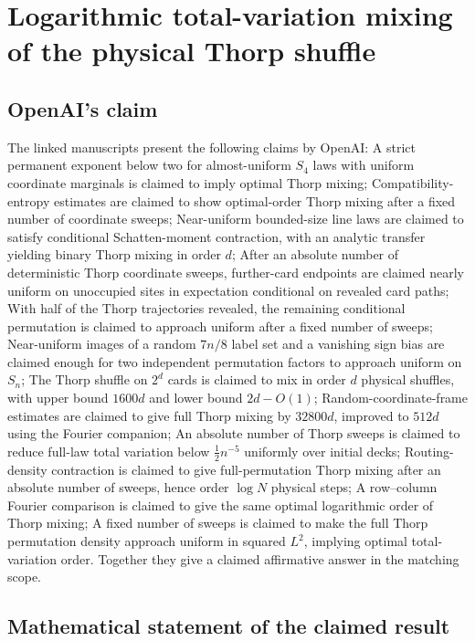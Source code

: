 \documentclass[11pt]{article}
\begin{document}
\section*{Logarithmic total-variation mixing of the physical Thorp shuffle}

\subsection{OpenAI's claim}
The linked manuscripts present the following claims by OpenAI: A strict permanent exponent below two for almost-uniform $S_4$ laws with uniform coordinate marginals is claimed to imply optimal Thorp mixing; Compatibility-entropy estimates are claimed to show optimal-order Thorp mixing after a fixed number of coordinate sweeps; Near-uniform bounded-size line laws are claimed to satisfy conditional Schatten-moment contraction, with an analytic transfer yielding binary Thorp mixing in order $d$; After an absolute number of deterministic Thorp coordinate sweeps, further-card endpoints are claimed nearly uniform on unoccupied sites in expectation conditional on revealed card paths; With half of the Thorp trajectories revealed, the remaining conditional permutation is claimed to approach uniform after a fixed number of sweeps; Near-uniform images of a random $7n/8$ label set and a vanishing sign bias are claimed enough for two independent permutation factors to approach uniform on $S_n$; The Thorp shuffle on $2^d$ cards is claimed to mix in order $d$ physical shuffles, with upper bound $1600d$ and lower bound $2d-O(1)$; Random-coordinate-frame estimates are claimed to give full Thorp mixing by $32800d$, improved to $512d$ using the Fourier companion; An absolute number of Thorp sweeps is claimed to reduce full-law total variation below $\tfrac12 n^{-5}$ uniformly over initial decks; Routing-density contraction is claimed to give full-permutation Thorp mixing after an absolute number of sweeps, hence order $\log N$ physical steps; A row--column Fourier comparison is claimed to give the same optimal logarithmic order of Thorp mixing; A fixed number of sweeps is claimed to make the full Thorp permutation density approach uniform in squared $L^2$, implying optimal total-variation order. Together they give a claimed affirmative answer in the matching scope.

\subsection{Mathematical statement of the claimed result}
\end{document}
